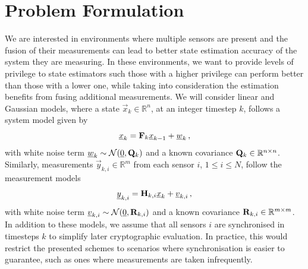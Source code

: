 \documentclass[letterpaper, 10 pt, conference]{ieeeconf}
\begin{document}
% 
%                                              
%                                              
%                                              
% 

\section{Problem Formulation}\label{sec:prob}
We are interested in environments where multiple sensors are present and the fusion of their measurements can lead to better state estimation accuracy of the system they are measuring. In these environments, we want to provide levels of privilege to state estimators such those with a higher privilege can perform better than those with a lower one, while taking into consideration the estimation benefits from fusing additional measurements. We will consider linear and Gaussian models, where a state $\vec{x}_k \in \mathbb{R}^n$, at an integer timestep $k$, follows a system model given by
\begin{equation}\label{eqn:system_model}
  {\underline{x}}_k = {{\mathbf{F}}}_k {\underline{x}}_{k-1} + {\underline{w}}_k\,,
\end{equation}
with white noise term ${\underline{w}}_k \sim \mathcal{N}({\underline{0}},{{\mathbf{Q}}}_k)$ and a known covariance ${{\mathbf{Q}}}_k \in \mathbb{R}^{n \times n}$. Similarly, measurements $\vec{y}_{k,i} \in \mathbb{R}^m$ from each sensor $i$, $1\leq i\leq N$, follow the measurement models
\begin{equation}\label{eqn:measurement_models}
  {\underline{y}}_{k,i} = {{\mathbf{H}}}_{k,i} {\underline{x}}_k + {\underline{v}}_{k,i}\,,
\end{equation}
with white noise term ${\underline{v}}_{k,i} \sim \mathcal{N}({\underline{0}},{{\mathbf{R}}}_{k,i})$ and a known covariance ${{\mathbf{R}}}_{k,i} \in \mathbb{R}^{m \times m}$. In addition to these models, we assume that all sensors $i$ are synchronised in timesteps $k$ to simplify later cryptographic evaluation. In practice, this would restrict the presented schemes to scenarios where synchronisation is easier to guarantee, such as ones where measurements are taken infrequently.
\end{document}
